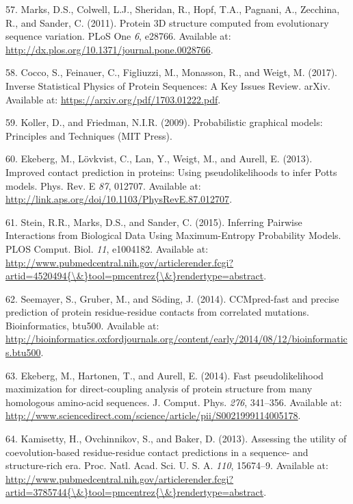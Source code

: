 \documentclass[12pt,a4paper,twoside]{book}
\theoremstyle{definition}
\theoremstyle{definition}
\theoremstyle{remark}
\begin{document}
\hypertarget{ref-Marks2011}{}
57. Marks, D.S., Colwell, L.J., Sheridan, R., Hopf, T.A., Pagnani, A.,
Zecchina, R., and Sander, C. (2011). Protein 3D structure computed from
evolutionary sequence variation. PLoS One \emph{6}, e28766. Available
at: \url{http://dx.plos.org/10.1371/journal.pone.0028766}.

\hypertarget{ref-Cocco2017}{}
58. Cocco, S., Feinauer, C., Figliuzzi, M., Monasson, R., and Weigt, M.
(2017). Inverse Statistical Physics of Protein Sequences: A Key Issues
Review. arXiv. Available at: \url{https://arxiv.org/pdf/1703.01222.pdf}.

\hypertarget{ref-Koller2009}{}
59. Koller, D., and Friedman, N.I.R. (2009). Probabilistic graphical
models: Principles and Techniques (MIT Press).

\hypertarget{ref-Ekeberg2013}{}
60. Ekeberg, M., Lövkvist, C., Lan, Y., Weigt, M., and Aurell, E.
(2013). Improved contact prediction in proteins: Using pseudolikelihoods
to infer Potts models. Phys. Rev. E \emph{87}, 012707. Available at:
\url{http://link.aps.org/doi/10.1103/PhysRevE.87.012707}.

\hypertarget{ref-Stein2015a}{}
61. Stein, R.R., Marks, D.S., and Sander, C. (2015). Inferring Pairwise
Interactions from Biological Data Using Maximum-Entropy Probability
Models. PLOS Comput. Biol. \emph{11}, e1004182. Available at:
\href{http://www.pubmedcentral.nih.gov/articlerender.fcgi?artid=4520494\%7B/\&\%7Dtool=pmcentrez\%7B/\&\%7Drendertype=abstract}{http://www.pubmedcentral.nih.gov/articlerender.fcgi?artid=4520494\{\textbackslash{}\&\}tool=pmcentrez\{\textbackslash{}\&\}rendertype=abstract}.

\hypertarget{ref-Seemayer2014}{}
62. Seemayer, S., Gruber, M., and Söding, J. (2014). CCMpred-fast and
precise prediction of protein residue-residue contacts from correlated
mutations. Bioinformatics, btu500. Available at:
\url{http://bioinformatics.oxfordjournals.org/content/early/2014/08/12/bioinformatics.btu500}.

\hypertarget{ref-Ekeberg2014}{}
63. Ekeberg, M., Hartonen, T., and Aurell, E. (2014). Fast
pseudolikelihood maximization for direct-coupling analysis of protein
structure from many homologous amino-acid sequences. J. Comput. Phys.
\emph{276}, 341--356. Available at:
\url{http://www.sciencedirect.com/science/article/pii/S0021999114005178}.

\hypertarget{ref-Kamisetty2013}{}
64. Kamisetty, H., Ovchinnikov, S., and Baker, D. (2013). Assessing the
utility of coevolution-based residue-residue contact predictions in a
sequence- and structure-rich era. Proc. Natl. Acad. Sci. U. S. A.
\emph{110}, 15674--9. Available at:
\href{http://www.pubmedcentral.nih.gov/articlerender.fcgi?artid=3785744\%7B/\&\%7Dtool=pmcentrez\%7B/\&\%7Drendertype=abstract}{http://www.pubmedcentral.nih.gov/articlerender.fcgi?artid=3785744\{\textbackslash{}\&\}tool=pmcentrez\{\textbackslash{}\&\}rendertype=abstract}.
\end{document}
